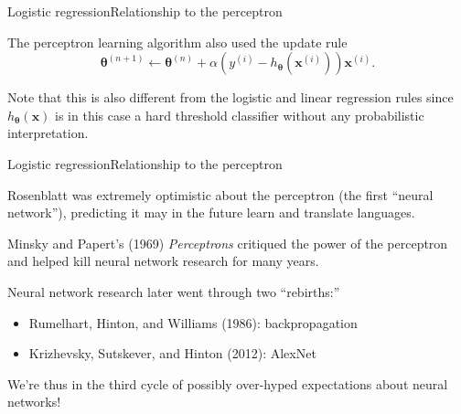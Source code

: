\documentclass{beamer}
\renewcommand{\vec}[1]{\boldsymbol{#1}}
\begin{document}
\begin{frame}{Logistic regression}{Relationship to the perceptron}

  The \alert{perceptron learning algorithm} also used the update rule
  \[ \vec{\theta}^{(n+1)} \leftarrow \vec{\theta}^{(n)} + \alpha(y^{(i)} -h_{\vec{\theta}}(\vec{x}^{(i)}))\vec{x}^{(i)}. \]

  \medskip

  Note that this is also different from the logistic and linear regression
  rules since $h_{\vec{\theta}}(\vec{x})$ is in this case a hard threshold
  classifier without any probabilistic interpretation.

\end{frame}


\begin{frame}{Logistic regression}{Relationship to the perceptron}

  Rosenblatt was extremely optimistic about the perceptron (the first
  ``neural network''), predicting it may in the future learn and
  translate languages.

  \medskip

  Minsky and Papert's (1969) \textit{Perceptrons} critiqued the power
  of the perceptron and helped kill neural network research for many
  years.

  \medskip

  Neural network research later went through two ``rebirths:''
  \begin{itemize}
  \item Rumelhart, Hinton, and Williams (1986): backpropagation
  \item Krizhevsky, Sutskever, and Hinton (2012): AlexNet
  \end{itemize}

  \medskip

  We're thus in the third cycle of possibly over-hyped expectations
  about neural networks!
  
\end{frame}
\end{document}

